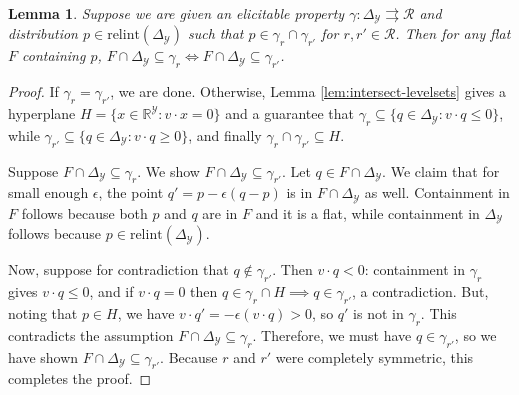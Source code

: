 \documentclass{article}
\newcommand{\reals}{\mathbb{R}}
\newcommand{\simplex}{\Delta_\Y}
\newcommand{\relint}[1]{\mathrm{relint}(#1)}
\newcommand{\R}{\mathcal{R}}
\newcommand{\Y}{\mathcal{Y}}
\newcommand{\toto}{\rightrightarrows}
\newtheorem{lemma}{Lemma}
\begin{document}
\begin{lemma}\label{lem:set-valued-prop-flats}
	Suppose we are given an elicitable property $\gamma : \simplex \toto \R$ and distribution $p \in \relint\simplex$ such that $p \in \gamma_r \cap \gamma_{r'}$ for $r,r' \in \R$.
	Then for any flat $F$ containing $p$, $F \cap \simplex \subseteq \gamma_r \iff F \cap \simplex \subseteq \gamma_{r'}$.
\end{lemma}
\begin{proof}
	If $\gamma_r = \gamma_{r'}$, we are done.
	Otherwise, Lemma \ref{lem:intersect-levelsets} gives a hyperplane $H = \{ x \in \reals^\Y : v \cdot x = 0\}$ and a guarantee that $\gamma_r \subseteq \{ q \in \simplex : v \cdot q \leq 0\}$, while $\gamma_{r'} \subseteq \{ q \in \simplex : v \cdot q \geq 0 \}$, and finally $\gamma_r \cap \gamma_{r'} \subseteq H$.
	
	Suppose $F \cap \simplex \subseteq \gamma_r$.
	We show $F \cap \simplex \subseteq \gamma_{r'}$.
	Let $q \in F \cap \simplex$.
	We claim that for small enough $\epsilon$, the point $q' = p - \epsilon (q-p)$ is in $F \cap \simplex$ as well.
	Containment in $F$ follows because both $p$ and $q$ are in $F$ and it is a flat, while containment in $\simplex$ follows because $p \in \relint\simplex$.
	
	Now, suppose for contradiction that $q \not\in \gamma_{r'}$.
	Then $v \cdot q < 0$: containment in $\gamma_r$ gives $v \cdot q \leq 0$, and if $v \cdot q = 0$ then $q \in \gamma_r \cap H \implies q \in \gamma_{r'}$, a contradiction.
	But, noting that $p \in H$, we have $v \cdot q' = -\epsilon (v \cdot q) > 0$, so $q'$ is not in $\gamma_{r}$.
	This contradicts the assumption $F \cap \simplex \subseteq \gamma_r$.
	Therefore, we must have $q \in \gamma_{r'}$, so we have shown $F \cap \simplex \subseteq \gamma_{r'}$.
	Because $r$ and $r'$ were completely symmetric, this completes the proof.
\end{proof}
\end{document}

